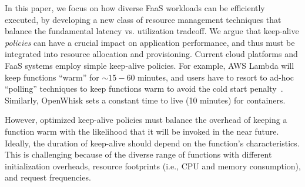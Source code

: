 \begin{comment}
In this paper, we explore this tradeoff, and argue for and develop principled keep-alive techniques. 
%
Current cloud platforms and FaaS systems employ simple keep-alive policies. 
%
For example, AWS Lambda will keep functions ``warm'' for $\sim 15-60$ minutes, and users have to resort to wasteful ``polling'' techniques to keep functions warm to avoid the cold start penalty~\cite{lambda-warm, lambda-limits, lambda-warm-hour}. 
% 
An optimized keep-alive policy must balance the overhead of keeping a function warm with the likelihood that the function will be called again in the near future, and the duration of keep-alive should depend on the function's characteristics. 
%
Designing keep-alive policies is challenging because of the diverse range of functions with different initialization overheads, resource footprints (i.e., CPU and memory consumption),  and request frequencies. 
%
\end{comment}


%
In this paper, we focus on how diverse FaaS workloads can be efficiently executed, by developing a new class of resource management techniques that balance the fundamental latency vs. utilization tradeoff.
We argue that keep-alive \emph{policies} can have a crucial impact on application performance, and thus must be integrated into resource allocation and provisioning. %
Current cloud platforms and FaaS systems employ simple keep-alive policies. 
For example, AWS Lambda will keep functions ``warm'' for $\sim 15-60$ minutes, and users have to resort to ad-hoc ``polling'' techniques to keep functions warm to avoid the cold start penalty~\cite{lambda-warm, lambda-limits, lambda-warm-hour}.
Similarly, OpenWhisk sets a constant time to live (10 minutes) for containers.


However, optimized keep-alive policies must balance the overhead of keeping a function warm with the likelihood that it will be invoked in the near future. 
Ideally, the duration of keep-alive should depend on the function's characteristics. 
This is challenging because of the diverse range of functions with different initialization overheads, resource footprints (i.e., CPU and memory consumption),  and request frequencies. 


